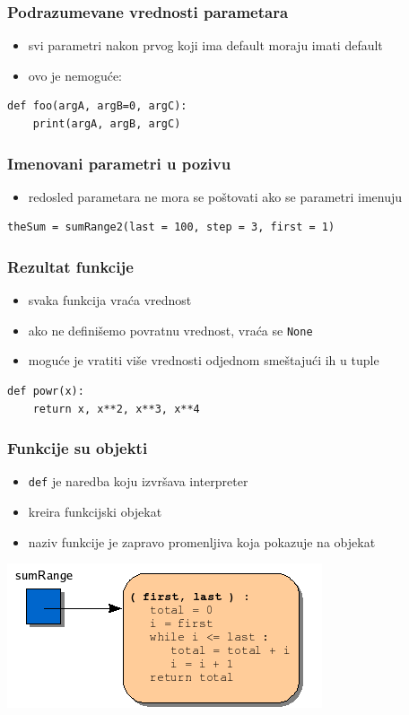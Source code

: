 \documentclass[compress]{beamer}
\begin{document}
\begin{frame}[fragile]
\frametitle{Podrazumevane vrednosti parametara}
\begin{itemize}
  \item svi parametri nakon prvog koji ima default moraju imati default
  \item ovo je nemoguće:
\end{itemize}
\begin{verbatim}
def foo(argA, argB=0, argC):
    print(argA, argB, argC)
\end{verbatim}
\end{frame}

\begin{frame}[fragile]
\frametitle{Imenovani parametri u pozivu}
\begin{itemize}
  \item redosled parametara ne mora se poštovati ako se parametri imenuju
\end{itemize}
\begin{verbatim}
theSum = sumRange2(last = 100, step = 3, first = 1)
\end{verbatim}
\end{frame}

\begin{frame}[fragile]
\frametitle{Rezultat funkcije}
\begin{itemize}
  \item svaka funkcija vraća vrednost
  \item ako ne definišemo povratnu vrednost, vraća se \texttt{None}
  \item moguće je vratiti više vrednosti odjednom smeštajući ih u tuple
\end{itemize}
\begin{verbatim}
def powr(x):
    return x, x**2, x**3, x**4
\end{verbatim}
\end{frame}

\begin{frame}[fragile]
\frametitle{Funkcije su objekti}
\begin{itemize}
  \item \texttt{def} je naredba koju izvršava interpreter
  \item kreira funkcijski objekat
  \item naziv funkcije je zapravo promenljiva koja pokazuje na objekat
\end{itemize}
\begin{center}
  \includegraphics[scale=0.7]{funcobject.png}
\end{center}
\end{frame}
\end{document}
